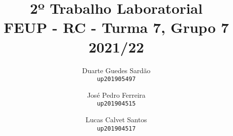 \author{
  Duarte Guedes Sardão\\
  \texttt{up201905497}
  \and
  José Pedro Ferreira\\
  \texttt{up201904515}
  \and
  Lucas Calvet Santos\\
  \texttt{up201904517}
}
\title{2º Trabalho Laboratorial\\\large FEUP - RC - Turma 7, Grupo 7\\\normalsize 2021/22}
\maketitle
\thispagestyle{empty}
\clearpage
\renewcommand*\contentsname{Índice}
\tableofcontents
\thispagestyle{empty}
\clearpage
\setcounter{page}{1}
